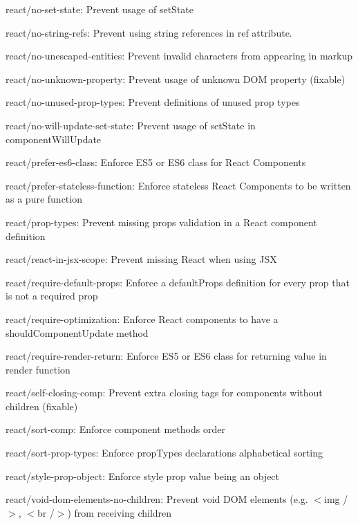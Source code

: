 \begin{DoxyItemize}
\item react/no-\/set-\/state\+: Prevent usage of {\ttfamily set\+State}
\item react/no-\/string-\/refs\+: Prevent using string references in {\ttfamily ref} attribute.
\item react/no-\/unescaped-\/entities\+: Prevent invalid characters from appearing in markup
\item react/no-\/unknown-\/property\+: Prevent usage of unknown D\+OM property (fixable)
\item react/no-\/unused-\/prop-\/types\+: Prevent definitions of unused prop types
\item react/no-\/will-\/update-\/set-\/state\+: Prevent usage of {\ttfamily set\+State} in {\ttfamily component\+Will\+Update}
\item react/prefer-\/es6-\/class\+: Enforce E\+S5 or E\+S6 class for React Components
\item react/prefer-\/stateless-\/function\+: Enforce stateless React Components to be written as a pure function
\item react/prop-\/types\+: Prevent missing props validation in a React component definition
\item react/react-\/in-\/jsx-\/scope\+: Prevent missing {\ttfamily React} when using J\+SX
\item react/require-\/default-\/props\+: Enforce a default\+Props definition for every prop that is not a required prop
\item react/require-\/optimization\+: Enforce React components to have a {\ttfamily should\+Component\+Update} method
\item react/require-\/render-\/return\+: Enforce E\+S5 or E\+S6 class for returning value in render function
\item react/self-\/closing-\/comp\+: Prevent extra closing tags for components without children (fixable)
\item react/sort-\/comp\+: Enforce component methods order
\item react/sort-\/prop-\/types\+: Enforce prop\+Types declarations alphabetical sorting
\item react/style-\/prop-\/object\+: Enforce style prop value being an object
\item react/void-\/dom-\/elements-\/no-\/children\+: Prevent void D\+OM elements (e.\+g. {\ttfamily $<$img /$>$}, {\ttfamily $<$br /$>$}) from receiving children
\end{DoxyItemize}


